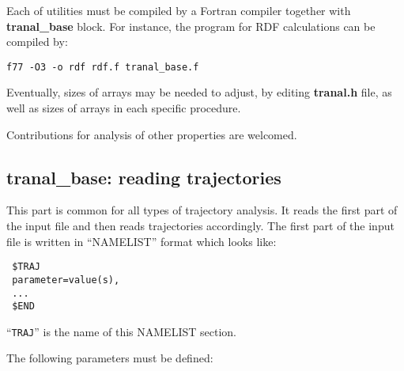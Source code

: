 \documentclass{article}
\begin{document}
Each of utilities must be compiled by a Fortran compiler together with
{\bf tranal\_base} block. For instance, the program for RDF calculations
can be compiled by:

\verb|f77 -O3 -o rdf rdf.f tranal_base.f|

Eventually, sizes of arrays may be needed to adjust, by editing {\bf tranal.h}
file, as well as sizes of arrays in each specific procedure.

Contributions for analysis of other properties are welcomed.


\subsection{tranal\_base: reading trajectories}

This part is common for all types of trajectory analysis. It reads the
first part of the input file and then reads trajectories accordingly. 
The first part of the input file is written in ``NAMELIST'' format
which looks like:

\begin{verbatim}
 $TRAJ
 parameter=value(s),
 ...
 $END
\end{verbatim}

``\verb|TRAJ|'' is the name of this NAMELIST section. 

The following parameters must be defined:
\end{document}
